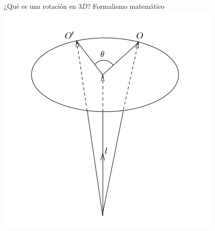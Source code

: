 \documentclass[10pt]{beamer}
\def\R{\mathbb{R}}
\begin{document}
\begin{frame}{¿Qué es una rotación en $3D$? Formalismo matemático}
	\includegraphics[scale=0.6]{images/rotation.png}
	
	
\end{frame}
\end{document}
